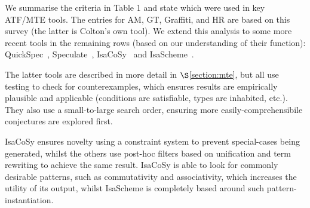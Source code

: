 %
%
%
%



We summarise the criteria in Table 1 and state which were used in key
ATF/MTE tools. The entries for AM, GT, Graffiti, \Bagai{} and HR are based
on this survey (the latter is Colton's own tool). We extend this analysis to
some more recent tools in the remaining rows (based on our understanding of
their function): QuickSpec~\cite{QuickSpec},
Speculate~\cite{braquehais2017speculate},
IsaCoSy~\cite{Johansson.Dixon.Bundy:conjecture-generation}
and IsaScheme~\cite{MontanoRivas2011}.

The latter tools are described in more detail in $\S$\ref{section:mte},
but all use testing to check for counterexamples, which ensures results are
empirically plausible and applicable (conditions are satisfiable, types are
inhabited, etc.). They also use a small-to-large search order, ensuring more
easily-comprehensibile conjectures are explored first.

IsaCoSy ensures novelty using a constraint system to prevent special-cases being
generated, whilst the others use post-hoc filters based on unification and term
rewriting to achieve the same result. IsaCoSy is able to look for commonly
desirable patterns, such as commutativity and associativity, which increases the
utility of its output, whilst IsaScheme is completely based around such
pattern-instantiation.

